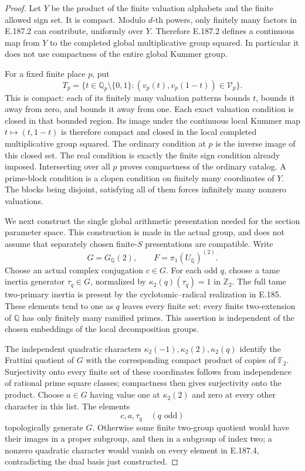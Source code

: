 \begin{proof}
Let \(Y\) be the product of the finite valuation alphabets
and the finite allowed sign set. It is compact. Modulo
\(d\)-th powers, only finitely many factors in E.187.2
can contribute, uniformly over \(Y\). Therefore E.187.2
defines a continuous map from \(Y\) to the completed
global multiplicative group squared. In particular it
does not use compactness of the entire global Kummer group.

For a fixed finite place \(p\), put
\[
 T_p=\{t\in\mathbb Q_p\setminus\{0,1\}:
       (v_p(t),v_p(1-t))\in\mathcal V_p\}.
 \tag{E.187.3}
\]
This is compact: each of its finitely many valuation
patterns bounds \(t\), bounds it away from zero, and
bounds it away from one. Each exact valuation condition
is closed in that bounded region. Its image under the
continuous local Kummer map \(t\mapsto(t,1-t)\) is
therefore compact and closed in the local completed
multiplicative group squared. The ordinary condition at
\(p\) is the inverse image of this closed set. The real
condition is exactly the finite sign condition already
imposed. Intersecting over all \(p\) proves compactness
of the ordinary catalog. A prime-block condition is a
clopen condition on finitely many coordinates of \(Y\).
The blocks being disjoint, satisfying all of them forces
infinitely many nonzero valuations.

We next construct the single global arithmetic presentation
needed for the section parameter space. This construction
is made in the actual group, and does not assume that
separately chosen finite-\(S\) presentations are compatible.
Write
\[
                   G=G_{\mathbb Q}(2),\qquad
                   F=\pi_1(U_{\overline{\mathbb Q}})^{(2)}.
\]
Choose an actual complex conjugation \(c\in G\).
For each odd \(q\), choose a tame inertia generator
\(\tau_q\in G\), normalized by
\(\kappa_2(q)(\tau_q)=1\) in \(\mathbb Z_2\).
The full tame two-primary inertia is present by the
cyclotomic--radical realization in E.185. These elements
tend to one as \(q\) leaves every finite set: every
finite two-extension of \(\mathbb Q\) has only finitely
many ramified primes. This assertion is independent of
the chosen embeddings of the local decomposition groups.

The independent quadratic characters
\(\kappa_2(-1),\kappa_2(2),\kappa_2(q)\) identify the
Frattini quotient of \(G\) with the corresponding compact
product of copies of \(\mathbb F_2\). Surjectivity onto
every finite set of these coordinates follows from
independence of rational prime square classes; compactness
then gives surjectivity onto the product. Choose \(a\in G\)
having value one at \(\kappa_2(2)\) and zero at every
other character in this list. The elements
\[
                         c,a,\tau_q\quad(q\text{ odd})
 \tag{E.187.4}
\]
topologically generate \(G\). Otherwise some finite
two-group quotient would have their images in a proper
subgroup, and then in a subgroup of index two; a nonzero
quadratic character would vanish on every element in
E.187.4, contradicting the dual basis just constructed.


\end{proof}
